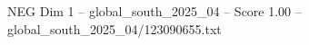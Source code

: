 \begin{textsample}{NEG Dim 1 – global\_south\_2025\_04 – Score 1.00 – global\_south\_2025\_04/123090655.txt}
\end{textsample}
